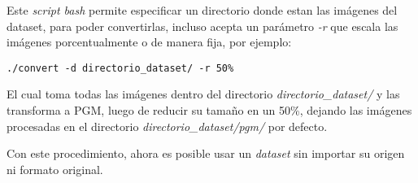 Este \emph{script bash} permite especificar un directorio donde estan las imágenes del dataset, para poder convertirlas, incluso acepta un parámetro \emph{-r} que escala las imágenes porcentualmente o de manera fija, por ejemplo:

\begin{verbatim}
./convert -d directorio_dataset/ -r 50%
\end{verbatim}

El cual toma todas las imágenes dentro del directorio \emph{directorio\_dataset\slash} y las transforma a PGM, luego de reducir su tamaño en un 50\%, dejando las imágenes procesadas en el directorio \emph{directorio\_dataset\slash pgm\slash} por defecto.

Con este procedimiento, ahora es posible usar un \emph{dataset} sin importar su origen ni formato original.
